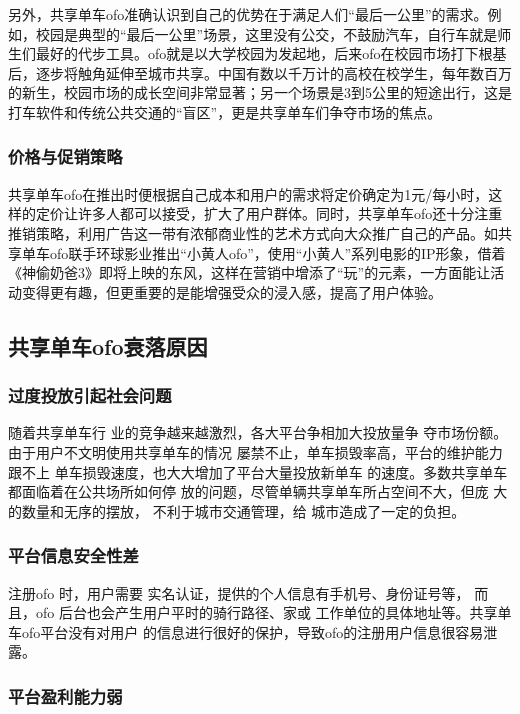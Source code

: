 \documentclass[a4paper,oneside,12pt]{article}
\begin{document}
另外，共享单车ofo准确认识到自己的优势在于满足人们“最后一公里”的需求。例如，校园是典型的“最后一公里”场景，这里没有公交，不鼓励汽车，自行车就是师生们最好的代步工具。ofo就是以大学校园为发起地，后来ofo在校园市场打下根基后，逐步将触角延伸至城市共享。中国有数以千万计的高校在校学生，每年数百万的新生，校园市场的成长空间非常显著；另一个场景是3到5公里的短途出行，这是打车软件和传统公共交通的“盲区”，更是共享单车们争夺市场的焦点。

\subsubsection{价格与促销策略}

共享单车ofo在推出时便根据自己成本和用户的需求将定价确定为1元/每小时，这样的定价让许多人都可以接受，扩大了用户群体。同时，共享单车ofo还十分注重推销策略，利用广告这一带有浓郁商业性的艺术方式向大众推广自己的产品。如共享单车ofo联手环球影业推出“小黄人ofo”，使用“小黄人”系列电影的IP形象，借着《神偷奶爸3》即将上映的东风，这样在营销中增添了“玩”的元素，一方面能让活动变得更有趣，但更重要的是能增强受众的浸入感，提高了用户体验。


\subsection{共享单车ofo衰落原因}

\subsubsection{过度投放引起社会问题}
随着共享单车行
业的竞争越来越激烈，各大平台争相加大投放量争
夺市场份额。由于用户不文明使用共享单车的情况
屡禁不止，单车损毁率高，平台的维护能力跟不上
单车损毁速度，也大大增加了平台大量投放新单车
的速度。多数共享单车都面临着在公共场所如何停
放的问题，尽管单辆共享单车所占空间不大，但庞
大的数量和无序的摆放， 不利于城市交通管理，给
城市造成了一定的负担。

\subsubsection{平台信息安全性差}
注册ofo 时，用户需要
实名认证，提供的个人信息有手机号、身份证号等，
而且，ofo 后台也会产生用户平时的骑行路径、家或
工作单位的具体地址等。共享单车ofo平台没有对用户
的信息进行很好的保护，导致ofo的注册用户信息很容易泄露。


\subsubsection{平台盈利能力弱}
\end{document}
